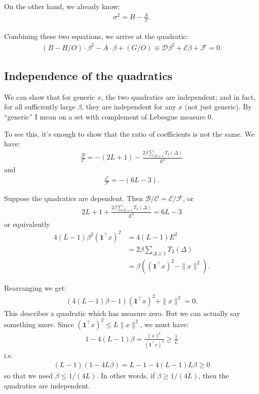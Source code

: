\documentclass{article}
\theoremstyle{thm}
\theoremstyle{definition}
\newcommand{\BB}{\mathcal{B}}
\newcommand{\CC}{\mathcal{C}}
\newcommand{\DD}{\mathcal{D}}
\newcommand{\EE}{\mathcal{E}}
\newcommand{\FF}{\mathcal{F}}
\newcommand{\1}{\mathbf{1}}
\begin{document}
On the other hand, we already know:
%
\begin{align}
%
    \sigma^2 = B - \frac{A}{\beta}.
%
\end{align}

Combining these two equations, we arrive at the quadratic:
%
\begin{align}
%
    (B-H/O) \cdot \beta^2 - A \cdot \beta + (G / O) 
    \equiv \DD \beta^2 + \EE \beta + \FF = 0.
%
\end{align}



\subsection{Independence of the quadratics}

We can show that for generic $x$, the two quadratics are independent; and in fact, for all sufficiently large $\beta$, they are independent for any $x$ (not just generic). By ``generic'' I mean on a set with complement of Lebesgue measure 0.

To see this, it's enough to show that the ratio of coefficients is not the same. We have:
%
\begin{align}
%
    \frac{\BB}{\CC} = -(2L + 1) - \frac{2\beta \sum_{\Delta \ge 1}T_2(\Delta)}{E^2}
%
\end{align}
%
and
%
\begin{align}
%
    \frac{\EE}{\FF} = - (6L - 3).
%
\end{align}

Suppose the quadratics are dependent. Then $\BB / \CC = \EE / \FF$, or
%
\begin{align}
%
    2L + 1 + \frac{2\beta \sum_{\Delta \ge 1}T_2(\Delta)}{E^2} = 6L  - 3
%
\end{align}
%
or equivalently
%
\begin{align}
%
    4(L-1)\beta^2(\1^\top x)^2 
    &=  4(L-1)E^2 
        \nonumber \\
    &= 2 \beta \sum_{\Delta\ge1}T_2(\Delta) 
        \nonumber \\
    &= \beta ( (\1^\top x)^2 - \|x\|^2 ) .
%
\end{align}

Rearranging we get:
%
\begin{align}
%
    (4(L-1)\beta - 1)(\1^\top x)^2 + \|x\|^2 = 0.
%
\end{align}
%
This describes a quadratic which has measure zero. But we can actually say something more. Since $(\1^\top x)^2 \le L \|x\|^2$, we must have:
%
\begin{align}
%
    1 - 4(L-1)\beta = \frac{\|x\|^2}{(\1^\top x)^2} \ge \frac{1}{L}
%
\end{align}
%
i.e.
%
\begin{align}
%
    (L-1)(1 - 4L\beta) = L -1 - 4(L-1)L \beta \ge 0
%
\end{align}
%
so that we need $\beta \le 1 / (4L)$. In other words, if $\beta \ge 1 / (4L)$, then the quadratics are independent.
\end{document}
